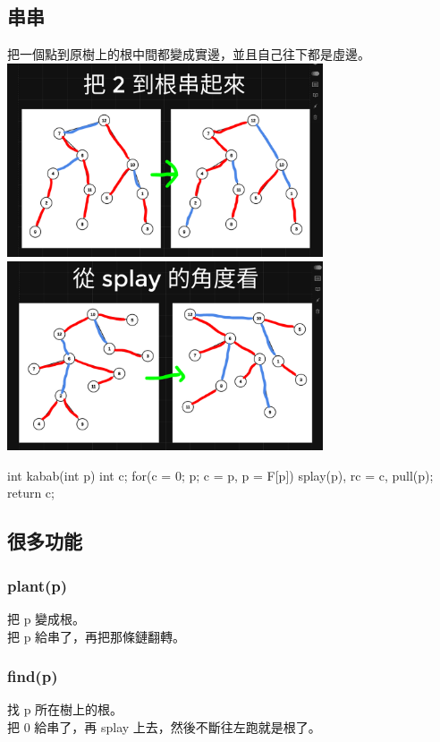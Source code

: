         \subsection{串串}
        把一個點到原樹上的根中間都變成實邊，並且自己往下都是虛邊。\\
        \includegraphics*[width = 0.7\textwidth]{images/TreeKabab} \\
        \includegraphics*[width = 0.7\textwidth]{images/SplayKabab} \\
        \begin{C++}
        int kabab(int p){
            int c;
            for(c = 0; p; c = p, p = F[p]){
                splay(p), rc = c, pull(p);
            }
            return c;
        }
        \end{C++}
        \subsection{很多功能}
            \subsubsection{plant(p)}
            把 p 變成根。\\
            把 p 給串了，再把那條鏈翻轉。\\
            \subsubsection{find(p)}
            找 p 所在樹上的根。\\
            把 0 給串了，再 splay 上去，然後不斷往左跑就是根了。\\

